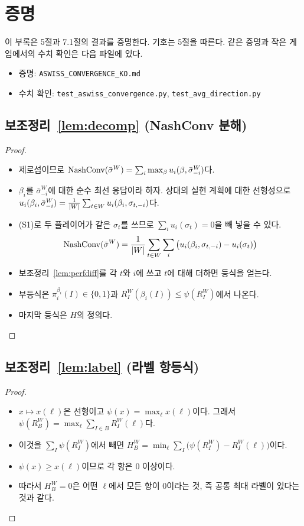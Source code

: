 \section{증명}\label{app:proofs}

이 부록은 5절과 7.1절의 결과를 증명한다. 기호는 5절을 따른다. 같은 증명과 작은 게임에서의 수치 확인은 다음 파일에 있다.
\begin{itemize}
  \item 증명: \texttt{ASWISS\_CONVERGENCE\_KO.md}
  \item 수치 확인: \texttt{test\_aswiss\_convergence.py}, \texttt{test\_avg\_direction.py}
\end{itemize}

\subsection{보조정리~\ref{lem:decomp} (NashConv 분해)}
\begin{proof}\mbox{}
\begin{itemize}
  \item 제로섬이므로 $\mathrm{NashConv}(\bar\sigma^W)=\sum_i\max_\beta u_i(\beta,\bar\sigma^W_{-i})$다.
  \item $\beta_i$를 $\bar\sigma^W_{-i}$에 대한 순수 최선 응답이라 하자. 상대의 실현 계획에 대한 선형성으로 $u_i(\beta_i,\bar\sigma^W_{-i})=\frac1{\left\lvert W\right\rvert}\sum_{t\in W}u_i(\beta_i,\sigma_{t,-i})$다.
  \item (S1)로 두 플레이어가 같은 $\sigma_t$를 쓰므로 $\sum_iu_i(\sigma_t)=0$을 빼 넣을 수 있다.
    \[
    \mathrm{NashConv}(\bar\sigma^W)=\frac1{\left\lvert W\right\rvert}\sum_{t\in W}\sum_i\big(u_i(\beta_i,\sigma_{t,-i})-u_i(\sigma_t)\big)
    \]
  \item 보조정리~\ref{lem:perfdiff}를 각 $t$와 $i$에 쓰고 $t$에 대해 더하면 등식을 얻는다.
  \item 부등식은 $\pi_i^{\beta_i}(I)\in\{0,1\}$과 $R_I^W(\beta_i(I))\le\psi(R_I^W)$에서 나온다.
  \item 마지막 등식은 $H$의 정의다.
\end{itemize}
\end{proof}

\subsection{보조정리~\ref{lem:label} (라벨 항등식)}
\begin{proof}\mbox{}
\begin{itemize}
  \item $x\mapsto x(\ell)$은 선형이고 $\psi(x)=\max_\ell x(\ell)$이다. 그래서 $\psi(R_B^W)=\max_\ell\sum_{I\in B}R_I^W(\ell)$다.
  \item 이것을 $\sum_I\psi(R_I^W)$에서 빼면 $H_B^W=\min_\ell\sum_I\big(\psi(R_I^W)-R_I^W(\ell)\big)$이다.
  \item $\psi(x)\ge x(\ell)$이므로 각 항은 0 이상이다.
  \item 따라서 $H_B^W=0$은 어떤 $\ell$에서 모든 항이 0이라는 것, 즉 공통 최대 라벨이 있다는 것과 같다.
\end{itemize}
\end{proof}

